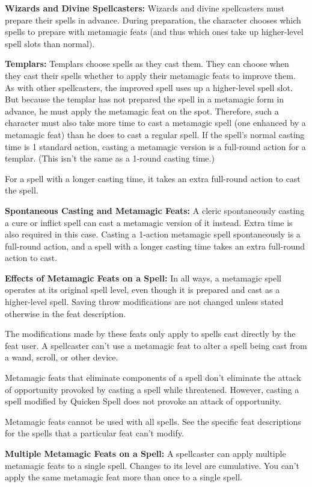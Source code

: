 \textbf{Wizards and Divine Spellcasters:} Wizards and divine spellcasters must prepare their spells in advance. During preparation, the character chooses which spells to prepare with metamagic feats (and thus which ones take up higher-level spell slots than normal).

\textbf{Templars:} Templars choose spells as they cast them. They can choose when they cast their spells whether to apply their metamagic feats to improve them. As with other spellcasters, the improved spell uses up a higher-level spell slot. But because the templar has not prepared the spell in a metamagic form in advance, he must apply the metamagic feat on the spot. Therefore, such a character must also take more time to cast a metamagic spell (one enhanced by a metamagic feat) than he does to cast a regular spell. If the spell's normal casting time is 1 standard action, casting a metamagic version is a full-round action for a templar. (This isn't the same as a 1-round casting time.)

For a spell with a longer casting time, it takes an extra full-round action to cast the spell.

\textbf{Spontaneous Casting and Metamagic Feats:} A cleric spontaneously casting a cure or inflict spell can cast a metamagic version of it instead. Extra time is also required in this case. Casting a 1-action metamagic spell spontaneously is a full-round action, and a spell with a longer casting time takes an extra full-round action to cast.

\textbf{Effects of Metamagic Feats on a Spell:} In all ways, a metamagic spell operates at its original spell level, even though it is prepared and cast as a higher-level spell. Saving throw modifications are not changed unless stated otherwise in the feat description.

The modifications made by these feats only apply to spells cast directly by the feat user. A spellcaster can't use a metamagic feat to alter a spell being cast from a wand, scroll, or other device.

Metamagic feats that eliminate components of a spell don't eliminate the attack of opportunity provoked by casting a spell while threatened. However, casting a spell modified by Quicken Spell does not provoke an attack of opportunity.

Metamagic feats cannot be used with all spells. See the specific feat descriptions for the spells that a particular feat can't modify.

\textbf{Multiple Metamagic Feats on a Spell:} A spellcaster can apply multiple metamagic feats to a single spell. Changes to its level are cumulative. You can't apply the same metamagic feat more than once to a single spell.

